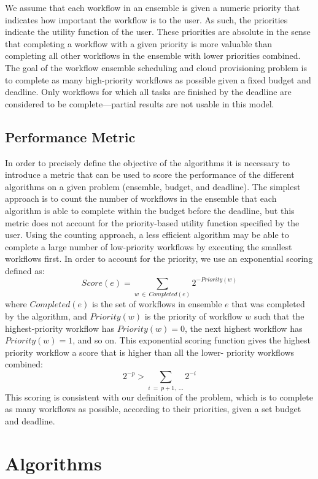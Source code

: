 \documentclass[preprint,5p]{elsarticle}
\begin{document}
We assume that each workflow in an ensemble is given a numeric priority that
indicates how important the workflow is to the user. As such, the priorities
indicate the utility function of the user. These priorities are absolute in
the sense that completing a workflow with a given priority is more valuable
than completing all other workflows in the ensemble with lower priorities
combined. The goal of the workflow ensemble scheduling and cloud provisioning
problem is to complete as many high-priority workflows as possible given a
fixed budget and deadline. Only workflows for which all tasks are finished by
the deadline are considered to be complete---partial results are not usable in
this model.

\subsection{Performance Metric}
\label{sec:perf_metric}
In order to precisely define the objective of the algorithms it is necessary to
introduce a metric that can be used to score the performance of the different
algorithms on a given problem (ensemble, budget, and deadline). The simplest
approach is to count the number of workflows in the ensemble that each algorithm
is able to complete within the budget before the deadline, but this metric does
not account for the priority-based utility function specified by the user. Using
the counting approach, a less efficient algorithm may be able to complete a
large number of low-priority workflows by executing the smallest workflows
first. In order to account for the priority, we use an exponential
scoring defined as:
\begin{equation}
\label{eq:score}
Score(e) = \sum_{w~\in~Completed(e)}{2^{-Priority(w)}}
\end{equation}
where $Completed(e)$ is the set of workflows in ensemble $e$ that was completed
by the algorithm, and $Priority(w)$ is the priority of workflow $w$ such that
the highest-priority workflow has $Priority(w)=0$, the next highest workflow has
$Priority(w)=1$, and so on. This exponential scoring function gives the highest
priority workflow a score that is higher than all the lower- priority workflows
combined:
$$ 2^{-p} > \sum_{i~=~p+1,~\ldots}2^{-i} $$
This scoring is consistent with our definition of the problem, which is to
complete as many workflows as possible, according to their priorities, given a
set budget and deadline.


\section{Algorithms}
\label{sec:algorithms}
\end{document}
